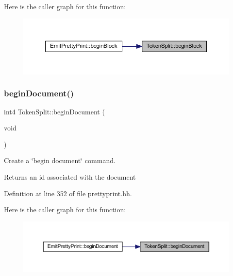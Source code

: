 Here is the caller graph for this function\+:
\nopagebreak
\begin{figure}[H]
\begin{center}
\leavevmode
\includegraphics[width=350pt]{class_token_split_ae7fb2a1b9de2cf7fd1348dca6177a07b_icgraph}
\end{center}
\end{figure}
\mbox{\label{class_token_split_a512f5438d3d735ae7ba82dca9afc882c}} 
\subsubsection{\texorpdfstring{beginDocument()}{beginDocument()}}
{\footnotesize\ttfamily int4 Token\+Split\+::begin\+Document (\begin{DoxyParamCaption}\item[{void}]{ }\end{DoxyParamCaption})\hspace{0.3cm}{\ttfamily [inline]}}



Create a \char`\"{}begin document\char`\"{} command. 

\begin{DoxyReturn}{Returns}
an id associated with the document 
\end{DoxyReturn}


Definition at line 352 of file prettyprint.\+hh.

Here is the caller graph for this function\+:
\nopagebreak
\begin{figure}[H]
\begin{center}
\leavevmode
\includegraphics[width=350pt]{class_token_split_a512f5438d3d735ae7ba82dca9afc882c_icgraph}
\end{center}
\end{figure}
\mbox{\label{class_token_split_a1b95fd9e440ec5036959e32667561885}} 
